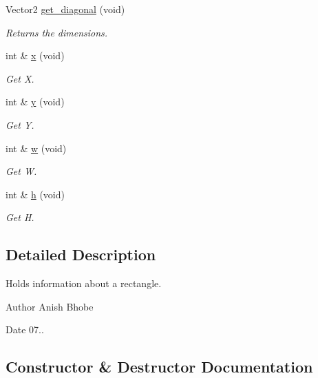 \begin{DoxyCompactItemize}
Vector2 \mbox{\hyperlink{classinferno_1_1graphics_1_1_quad_ac74e1a04b7db17b490182fc130b010e5}{get\+\_\+diagonal}} (void)
\begin{DoxyCompactList}\small\item\em Returns the dimensions. \end{DoxyCompactList}\item 
int \& \mbox{\hyperlink{classinferno_1_1graphics_1_1_quad_aed2540662e5f85e5ab467517dccaf90f}{x}} (void)
\begin{DoxyCompactList}\small\item\em Get X. \end{DoxyCompactList}\item 
int \& \mbox{\hyperlink{classinferno_1_1graphics_1_1_quad_af653ab1040d4647e88487287765f7404}{y}} (void)
\begin{DoxyCompactList}\small\item\em Get Y. \end{DoxyCompactList}\item 
int \& \mbox{\hyperlink{classinferno_1_1graphics_1_1_quad_a7670f2faa1d1b88bb8202d4efa968899}{w}} (void)
\begin{DoxyCompactList}\small\item\em Get W. \end{DoxyCompactList}\item 
int \& \mbox{\hyperlink{classinferno_1_1graphics_1_1_quad_af5653f4d125b24ac94ab8367e310e541}{h}} (void)
\begin{DoxyCompactList}\small\item\em Get H. \end{DoxyCompactList}\end{DoxyCompactItemize}


\subsection{Detailed Description}
Holds information about a rectangle. 

\begin{DoxyAuthor}{Author}
Anish Bhobe 
\end{DoxyAuthor}
\begin{DoxyDate}{Date}
07.. 
\end{DoxyDate}


\subsection{Constructor \& Destructor Documentation}
\mbox{\label{classinferno_1_1graphics_1_1_quad_a2f73b62580d65d3eea736df1ffccbd1c}} 
